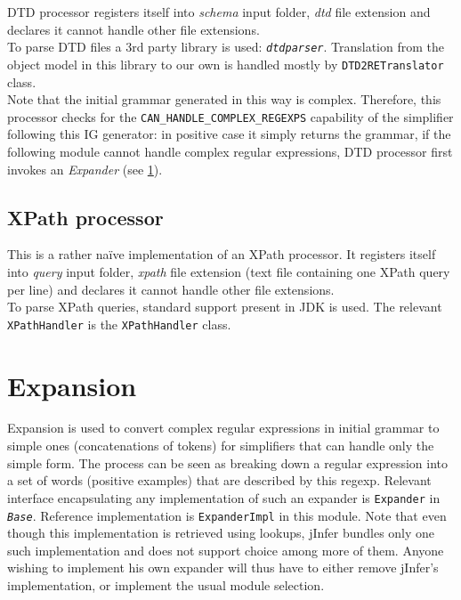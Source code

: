 \documentclass[a4paper,10pt,oneside]{article}
\newcommand{\code}[1]{\texttt{#1}}
\newcommand{\jmodule}[1]{\texttt{\textit{#1}}}
\begin{document}
DTD processor registers itself into \emph{schema} input folder, \emph{dtd} file extension and declares it cannot handle other file extensions.\\
To parse DTD files a 3rd party library is used: \jmodule{dtdparser}. %
Translation from the object model in this library to our own is handled mostly by \code{DTD2RETranslator} class.\\
Note that the initial grammar generated in this way is complex. Therefore, this processor checks for the \code{CAN\_HANDLE\_COMPLEX\_REGEXPS} capability of the simplifier following this IG generator: in positive case it simply returns the grammar, if the following module cannot handle complex regular expressions, DTD processor first invokes an \emph{Expander} (see \ref{section-expansion}).

\subsection{XPath processor}

This is a rather na\"{i}ve implementation of an XPath processor. It registers itself into \emph{query} input folder, \emph{xpath} file extension (text file containing one XPath query per line) and declares it cannot handle other file extensions.\\
To parse XPath queries, standard support present in JDK is used. The relevant \code{XPathHandler} is the \code{XPathHandler} class.\\

\section{Expansion} \label{section-expansion}

Expansion is used to convert complex regular expressions in initial grammar to simple ones (concatenations of tokens) for simplifiers that can handle only the simple form. The process can be seen as breaking down a regular expression into a set of words (positive examples) that are described by this regexp. Relevant interface encapsulating any implementation of such an expander is \code{Expander} in \jmodule{Base}. Reference implementation is \code{ExpanderImpl} in this module. Note that even though this implementation is retrieved using lookups, jInfer bundles only one such implementation and does not support choice among more of them. Anyone wishing to implement his own expander will thus have to either remove jInfer's implementation, or implement the usual module selection. %
\end{document}
